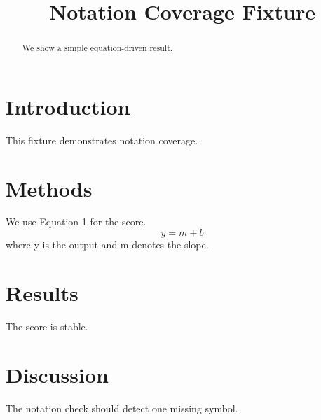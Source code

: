 \title{Notation Coverage Fixture}

\begin{abstract}
We show a simple equation-driven result.
\end{abstract}

\section{Introduction}
This fixture demonstrates notation coverage.

\section{Methods}
We use Equation 1 for the score.
\begin{equation}
y = m + b
\end{equation}
where y is the output and m denotes the slope.

\section{Results}
The score is stable.

\section{Discussion}
The notation check should detect one missing symbol.


